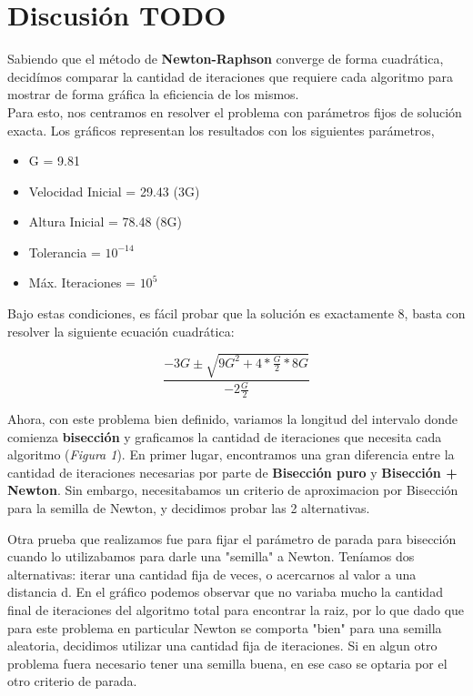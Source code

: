 \documentclass[a4paper]{article}
\begin{document}

\section{Discusión TODO}
Sabiendo que el método de \textbf{Newton-Raphson} converge de forma cuadrática, decidímos comparar la cantidad de iteraciones que requiere cada algoritmo para mostrar de forma gráfica la eficiencia de los mismos. \\

Para esto, nos centramos en resolver el problema con parámetros fijos de solución exacta.
Los gráficos representan los resultados con los siguientes parámetros, 
\begin{itemize}
  \item{G = 9.81}
  \item{Velocidad Inicial = 29.43 (3G)} 
  \item{Altura Inicial = 78.48 (8G)} 
  \item{Tolerancia = $10^{-14}$} 
  \item{Máx. Iteraciones = $10^5$}
\end{itemize}

Bajo estas condiciones, es fácil probar que la solución es exactamente 8, basta con resolver la siguiente ecuación cuadrática:

\begin{displaymath}
  \frac{-3G \pm \sqrt{9G^2 + 4*\frac{G}{2}*8G}}{-2\frac{G}{2}}
\end{displaymath}

Ahora, con este problema bien definido, variamos la longitud del intervalo donde comienza \textbf{bisección} y graficamos la cantidad de iteraciones que necesita cada algoritmo (\textit{Figura 1}).
En primer lugar, encontramos una gran diferencia entre la cantidad de iteraciones necesarias por parte de \textbf{Bisección puro} y \textbf{Bisección + Newton}. Sin embargo, necesitabamos un criterio de aproximacion por Bisección para la semilla de Newton, y decidimos probar las 2 alternativas. 



Otra prueba que realizamos fue para fijar el parámetro de parada para bisección cuando lo utilizabamos para darle una "semilla" a Newton. Teníamos dos alternativas: iterar una cantidad fija de veces, o acercarnos al valor a una distancia d.
En el gráfico podemos observar que no variaba mucho la cantidad final de iteraciones del algoritmo total para encontrar la raiz, por lo que dado que para este problema en particular Newton se comporta "bien" para una semilla aleatoria, decidimos utilizar una cantidad fija de iteraciones.
Si en algun otro problema fuera necesario tener una semilla buena, en ese caso se optaria por el otro criterio de parada.
 
\end{document}
